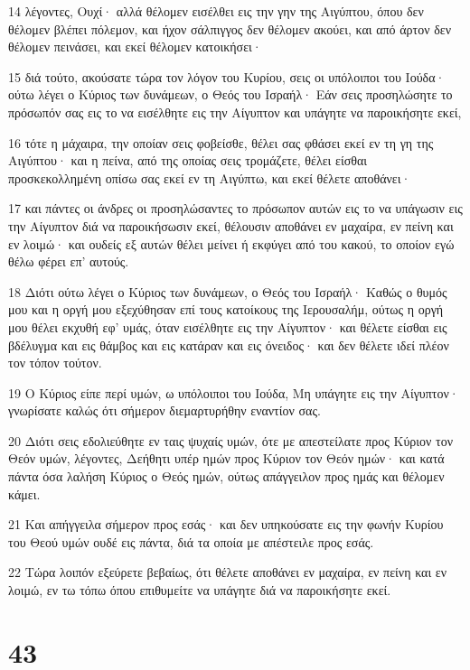 \par 14 λέγοντες, Ουχί· αλλά θέλομεν εισέλθει εις την γην της Αιγύπτου, όπου δεν θέλομεν βλέπει πόλεμον, και ήχον σάλπιγγος δεν θέλομεν ακούει, και από άρτον δεν θέλομεν πεινάσει, και εκεί θέλομεν κατοικήσει·
\par 15 διά τούτο, ακούσατε τώρα τον λόγον του Κυρίου, σεις οι υπόλοιποι του Ιούδα· ούτω λέγει ο Κύριος των δυνάμεων, ο Θεός του Ισραήλ· Εάν σεις προσηλώσητε το πρόσωπόν σας εις το να εισέλθητε εις την Αίγυπτον και υπάγητε να παροικήσητε εκεί,
\par 16 τότε η μάχαιρα, την οποίαν σεις φοβείσθε, θέλει σας φθάσει εκεί εν τη γη της Αιγύπτου· και η πείνα, από της οποίας σεις τρομάζετε, θέλει είσθαι προσκεκολλημένη οπίσω σας εκεί εν τη Αιγύπτω, και εκεί θέλετε αποθάνει·
\par 17 και πάντες οι άνδρες οι προσηλώσαντες το πρόσωπον αυτών εις το να υπάγωσιν εις την Αίγυπτον διά να παροικήσωσιν εκεί, θέλουσιν αποθάνει εν μαχαίρα, εν πείνη και εν λοιμώ· και ουδείς εξ αυτών θέλει μείνει ή εκφύγει από του κακού, το οποίον εγώ θέλω φέρει επ' αυτούς.
\par 18 Διότι ούτω λέγει ο Κύριος των δυνάμεων, ο Θεός του Ισραήλ· Καθώς ο θυμός μου και η οργή μου εξεχύθησαν επί τους κατοίκους της Ιερουσαλήμ, ούτως η οργή μου θέλει εκχυθή εφ' υμάς, όταν εισέλθητε εις την Αίγυπτον· και θέλετε είσθαι εις βδέλυγμα και εις θάμβος και εις κατάραν και εις όνειδος· και δεν θέλετε ιδεί πλέον τον τόπον τούτον.
\par 19 Ο Κύριος είπε περί υμών, ω υπόλοιποι του Ιούδα, Μη υπάγητε εις την Αίγυπτον· γνωρίσατε καλώς ότι σήμερον διεμαρτυρήθην εναντίον σας.
\par 20 Διότι σεις εδολιεύθητε εν ταις ψυχαίς υμών, ότε με απεστείλατε προς Κύριον τον Θεόν υμών, λέγοντες, Δεήθητι υπέρ ημών προς Κύριον τον Θεόν ημών· και κατά πάντα όσα λαλήση Κύριος ο Θεός ημών, ούτως απάγγειλον προς ημάς και θέλομεν κάμει.
\par 21 Και απήγγειλα σήμερον προς εσάς· και δεν υπηκούσατε εις την φωνήν Κυρίου του Θεού υμών ουδέ εις πάντα, διά τα οποία με απέστειλε προς εσάς.
\par 22 Τώρα λοιπόν εξεύρετε βεβαίως, ότι θέλετε αποθάνει εν μαχαίρα, εν πείνη και εν λοιμώ, εν τω τόπω όπου επιθυμείτε να υπάγητε διά να παροικήσητε εκεί.

\chapter{43}

